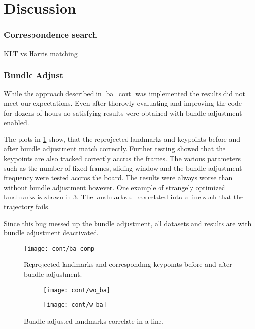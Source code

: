 \section{Discussion}

\subsubsection{Correspondence search}

KLT vs Harris matching

\subsubsection{Bundle Adjust}
While the approach described in \cref{ba_cont} was implemented the results did not meet our expectations. Even after thorowly evaluating and improving the code for dozens of hours no satisfying results were obtained with bundle adjustment enabled.

The plots in \cref{fig:ba_comp} show, that the reprojected landmarks and keypoints before and after bundle adjustment match correctly. Further testing showed that the keypoints are also tracked correctly accros the frames. 
The various parameters such as the number of fixed frames, sliding window and the bundle adjustment frequency were tested accros the board. The results were always worse than without bundle adjustment however.
One example of strangely optimized landmarks is shown in \cref{ba_vs_wo_ba}. The landmarks all correlated into a line such that the trajectory fails.

Since this bug messed up the bundle adjustment, all datasets and results are with bundle adjustment deactivated.

\begin{figure}
	\centering
	\texttt{[image: cont/ba\_comp]}
	\caption{Reprojected landmarks and corresponding keypoints before and after bundle adjustment.}
	\label{fig:ba_comp}
\end{figure}


\begin{figure}
\centering
   \begin{subfigure}[b]{0.55\textwidth}
   \texttt{[image: cont/wo\_ba]}
\end{subfigure}

\begin{subfigure}[b]{0.55\textwidth}
   \texttt{[image: cont/w\_ba]}
   \label{ba_vs_wo_ba}
\end{subfigure}
\caption{Bundle adjusted landmarks correlate in a line.}
\end{figure}


